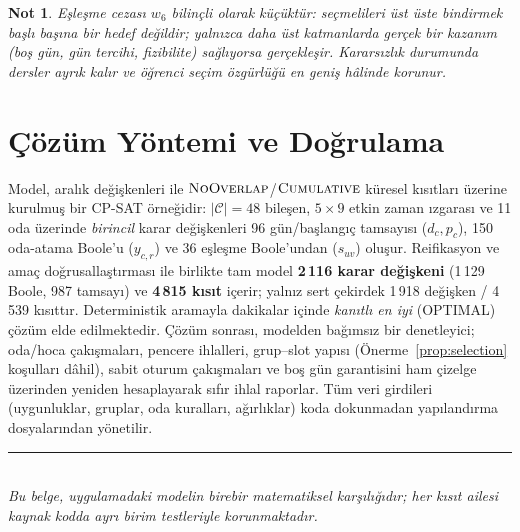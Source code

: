 \documentclass[11pt,a4paper]{article}
\newtheorem{remark}{Not}
\theoremstyle{definition}
\newcommand{\SET}[1]{\mathcal{#1}}
\begin{document}
\begin{remark}
Eşleşme cezası $w_6$ bilinçli olarak \emph{küçüktür}: seçmelileri üst üste
bindirmek başlı başına bir hedef değildir; yalnızca daha üst katmanlarda gerçek
bir kazanım (boş gün, gün tercihi, fizibilite) sağlıyorsa gerçekleşir.
Kararsızlık durumunda dersler ayrık kalır ve öğrenci seçim özgürlüğü en geniş
hâlinde korunur.
\end{remark}

\section{Çözüm Yöntemi ve Doğrulama}

Model, aralık değişkenleri ile $\textsc{NoOverlap}$/$\textsc{Cumulative}$ küresel
kısıtları üzerine kurulmuş bir \textsc{CP-SAT} örneğidir: $|\SET{C}|=48$ bileşen,
$5\times 9$ etkin zaman ızgarası ve 11 oda üzerinde \emph{birincil} karar
değişkenleri 96 gün/başlangıç tamsayısı ($d_c,p_c$), 150 oda-atama Boole'u
($y_{c,r}$) ve 36 eşleşme Boole'undan ($s_{uv}$) oluşur. Reifikasyon ve amaç
doğrusallaştırması ile birlikte tam model \textbf{2\,116 karar değişkeni}
(1\,129 Boole, 987 tamsayı) ve \textbf{4\,815 kısıt} içerir; yalnız sert
çekirdek 1\,918 değişken / 4\,539 kısıttır. Deterministik aramayla
dakikalar içinde \emph{kanıtlı en iyi} (OPTIMAL) çözüm elde edilmektedir. Çözüm sonrası,
modelden bağımsız bir denetleyici; oda/hoca çakışmaları, pencere ihlalleri,
grup--slot yapısı (Önerme~\ref{prop:selection} koşulları dâhil), sabit oturum
çakışmaları ve boş gün garantisini ham çizelge üzerinden yeniden hesaplayarak
sıfır ihlal raporlar. Tüm veri girdileri (uygunluklar, gruplar, oda kuralları,
ağırlıklar) koda dokunmadan yapılandırma dosyalarından yönetilir.

\vspace{6pt}
\begin{center}
\rule{0.6\textwidth}{0.6pt}\\[4pt]
{\small\itshape Bu belge, uygulamadaki modelin birebir matematiksel karşılığıdır;
her kısıt ailesi kaynak kodda ayrı birim testleriyle korunmaktadır.}
\end{center}
\end{document}

